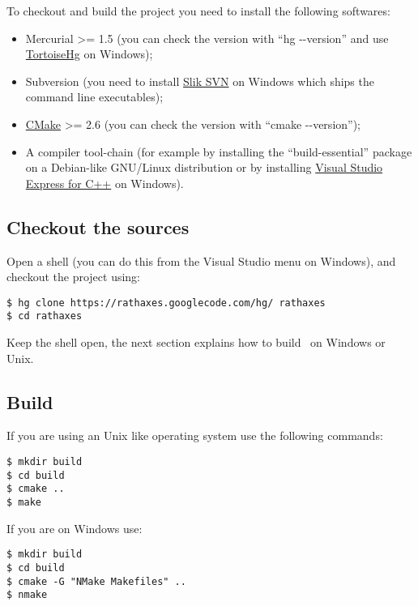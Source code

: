 \documentclass[francais]{rtxarticle}
\begin{document}
To checkout and build the project you need to install the following softwares:
\begin{itemize}
\item Mercurial >= 1.5 (you can check the version with ``hg {-}{-}version'' and
      use \href{http://tortoisehg.bitbucket.org/download/index.html}{TortoiseHg}
      on Windows);
\item Subversion (you need to install \href{http://www.sliksvn.com/en/download}{Slik
      SVN} on Windows which ships the command line executables);
\item \href{http://www.cmake.org/cmake/resources/software.html}{CMake} >= 2.6
      (you can check the version with ``cmake {-}{-}version'');
\item A compiler tool-chain (for example by installing the ``build-essential'' package on a
      Debian-like GNU/Linux distribution or by installing
      \href{http://www.microsoft.com/express/Downloads/#2010-Visual-CPP}{Visual Studio Express for C++}
      on Windows).
\end{itemize}

\subsection{Checkout the sources}

Open a shell (you can do this from the Visual Studio menu on Windows), and
checkout the project using:

\begin{lstlisting}
$ hg clone https://rathaxes.googlecode.com/hg/ rathaxes
$ cd rathaxes
\end{lstlisting}

Keep the shell open, the next section explains how to build \rtx\ on Windows or
Unix.

\subsection{Build \rtx}

If you are using an Unix like operating system use the following commands:

\begin{lstlisting}
$ mkdir build
$ cd build
$ cmake ..
$ make
\end{lstlisting}

If you are on Windows use:

\begin{lstlisting}
$ mkdir build
$ cd build
$ cmake -G "NMake Makefiles" ..
$ nmake
\end{lstlisting}

\rtxmaketitleblock
\end{document}
